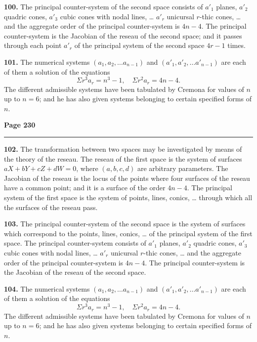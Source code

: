\documentclass[12pt,a4paper]{article}
\theoremstyle{plain}
\theoremstyle{definition}
\theoremstyle{remark}
\begin{document}
\textbf{100.} The principal counter-system of the second space consists of $a'_1$ planes, $a'_2$ quadric cones, $a'_3$ cubic cones with nodal lines, \ldots{} $a'_r$ unicursal $r$-thic cones, \ldots{} and the aggregate order of the principal counter-system is $4n - 4$. The principal counter-system is the Jacobian of the reseau of the second space; and it passes through each point $a'_r$ of the principal system of the second space $4r - 1$ times.

\textbf{101.} The numerical systems $(a_1, a_2, \ldots a_{n-1})$ and $(a'_1, a'_2, \ldots a'_{n-1})$ are each of them a solution of the equations
\[
\Sigma r^3 a_r = n^3 - 1, \quad \Sigma r^2 a_r = 4n - 4.
\]
The different admissible systems have been tabulated by Cremona for values of $n$ up to $n = 6$; and he has also given systems belonging to certain specified forms of $n$.

\newpage
\noindent\textbf{Page 230}\\
\noindent\rule{\textwidth}{0.4pt}

\smallskip

\noindent\textbf{102.} The transformation between two spaces may be investigated by means of the theory of the reseau. The reseau of the first space is the system of surfaces $aX + bY + cZ + dW = 0$, where $(a, b, c, d)$ are arbitrary parameters. The Jacobian of the reseau is the locus of the points where four surfaces of the reseau have a common point; and it is a surface of the order $4n - 4$. The principal system of the first space is the system of points, lines, conics, \ldots{} through which all the surfaces of the reseau pass.

\textbf{103.} The principal counter-system of the second space is the system of surfaces which correspond to the points, lines, conics, \ldots{} of the principal system of the first space. The principal counter-system consists of $a'_1$ planes, $a'_2$ quadric cones, $a'_3$ cubic cones with nodal lines, \ldots{} $a'_r$ unicursal $r$-thic cones, \ldots{} and the aggregate order of the principal counter-system is $4n - 4$. The principal counter-system is the Jacobian of the reseau of the second space.

\textbf{104.} The numerical systems $(a_1, a_2, \ldots a_{n-1})$ and $(a'_1, a'_2, \ldots a'_{n-1})$ are each of them a solution of the equations
\[
\Sigma r^3 a_r = n^3 - 1, \quad \Sigma r^2 a_r = 4n - 4.
\]
The different admissible systems have been tabulated by Cremona for values of $n$ up to $n = 6$; and he has also given systems belonging to certain specified forms of $n$.
\end{document}
